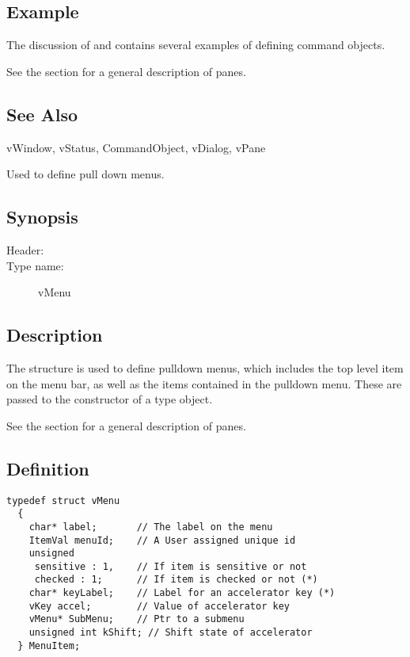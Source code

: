 \subsection* {Example}

The discussion of  and  contains
several examples of defining command objects.

See the section  for a general description of panes.

\subsection* {See Also}

vWindow, vStatus, CommandObject, vDialog, vPane


Used to define pull down menus.

\subsection* {Synopsis}

\begin{description}
	\item [Header:] 
	\item [Type name:] vMenu
\end{description}

\subsection* {Description}

The  structure is used to define pulldown menus,
which includes the top level item on the menu bar, as well as the
items contained in the pulldown menu. These are passed to the
constructor of a  type object.

See the section  for a general description of panes.

\subsection* {Definition}

\footnotesize
\begin{verbatim}
typedef struct vMenu
  {
    char* label;       // The label on the menu
    ItemVal menuId;    // A User assigned unique id
    unsigned
     sensitive : 1,    // If item is sensitive or not
     checked : 1;      // If item is checked or not (*)
    char* keyLabel;    // Label for an accelerator key (*)
    vKey accel;        // Value of accelerator key
    vMenu* SubMenu;    // Ptr to a submenu 
    unsigned int kShift; // Shift state of accelerator
  } MenuItem;
\end{verbatim}
\normalfont\normalsize

